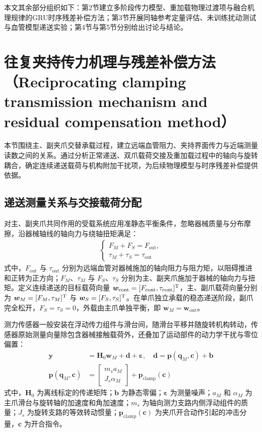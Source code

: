 \documentclass{JQRnew}
\begin{document}
本文其余部分组织如下：第2节建立多阶段传力模型、重加载物理过渡项与融合机理规律的GRU时序残差补偿方法；第3节开展同轴参考定量评估、未训练扰动测试与血管模型递送实验；第4节与第5节分别给出讨论与结论。

\section{往复夹持传力机理与残差补偿方法（Reciprocating clamping transmission mechanism and residual compensation method）}

本节围绕主、副夹爪交替承载过程，建立远端血管阻力、夹持界面传力与近端测量读数之间的关系。通过分析正常递送、双爪载荷交接及重加载过程中的轴向与旋转耦合，确定连续递送载荷与机构附加干扰项，为后续物理模型与时序残差补偿提供依据。

\subsection{递送测量关系与交接载荷分配}

对主、副夹爪共同作用的受载系统应用准静态平衡条件，忽略器械质量与分布摩擦，沿器械轴线的轴向力与绕轴扭矩满足：
\begin{align}
	\label{eq1}
	\begin{cases}
		F_{M} + F_{S} = F_{\text{out}}, \\
		\tau_{M} + \tau_{S} = \tau_{\text{out}}
	\end{cases}
\end{align}
式中，$F_{\text{out}}$ 与 $\tau_{\text{out}}$ 分别为远端血管对器械施加的轴向阻力与阻力矩，以阻碍推进和正转为正方向；$F_M$、$\tau_M$ 与 $F_S$、$\tau_S$ 分别为主、副夹爪施加于器械的轴向力与扭矩。定义连续递送的目标载荷向量 $\bm{w}_{\text{cont}} = [F_{\text{cont}},\tau_{\text{cont}}]^{\rm T}$，主、副爪载荷向量分别为 $\bm{w}_M = [F_M,\tau_M]^{\rm T}$ 与 $\bm{w}_S = [F_S,\tau_S]^{\rm T}$。在单爪独立承载的稳态递送阶段，副爪完全松开，$F_S = \tau_S = 0$，外载由主爪单独平衡，即 $\bm{w}_M = \bm{w}_{\text{out}}$。

测力传感器一般安装在浮动传力组件与滑台间，随滑台平移并随旋转机构转动，传感器原始测量向量除包含器械接触载荷外，还叠加了运动部件的动力学干扰与零位偏置：
\begin{align}
	\label{eq2}
	\bm{y} &= \bm{H}_{0}\bm{w}_{M} + \bm{d} + \bm{\varepsilon},\quad \bm{d} = \bm{p}(\bm{q}_{M},\bm{c}) + \bm{b} \\
	\label{eq3}
	\bm{p}(\bm{q}_{M},\bm{c}) &=
	\begin{bmatrix}
		m_s a_M \\
		J_s\alpha_M
	\end{bmatrix}
	+ \bm{p}_{\text{clamp}}(\bm{c})
\end{align}
式中，$\bm{H}_0$ 为离线标定的传递矩阵；$\bm{b}$ 为静态零偏；$\bm{\varepsilon}$ 为测量噪声；$a_M$ 和 $\alpha_M$ 为主爪滑台与旋转轴的加速度和角加速度；$m_s$ 为轴向测力支路内侧浮动组件的质量；$J_s$ 为旋转支路的等效转动惯量；$\bm{p}_{\text{clamp}}(\bm{c})$ 为夹爪开合动作引起的冲击分量，$\bm{c}$ 为开合指令。
\end{document}

